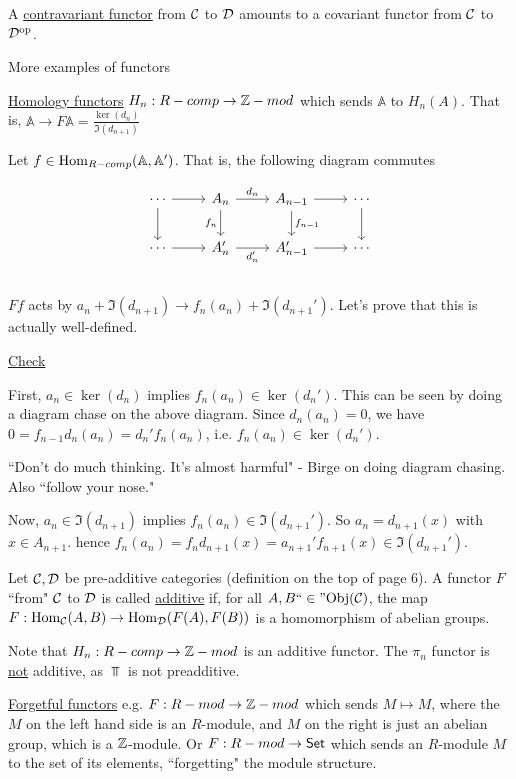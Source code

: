 \documentclass[x11names,reqno,14pt]{extarticle}
\newcommand{\A}{\mathbb{A}}
\newcommand{\fin}{``\in"}
\begin{document}

A \underline{contravariant functor} from $\mathcal{C}$ to $\mathcal{D}$ amounts to a covariant functor from $\mathcal{C}$ to $\mathcal{D}^{\mathrm{op}}$.

More examples of functors

\exm

\underline{Homology functors} $H_n:R-comp\to \mathbb{Z}-mod$ which sends $\A$ to $H_n(A)$. That is, $\A\to F\A = \frac{\ker(d_n)}{\Im(d_{n + 1})}$

Let $f \in \Hom_{R-comp}(\A,\A')$. That is, the following diagram commutes

\[
\begin{tikzcd}
\cdots \ar[r] \ar[d] & A_{n} \ar[d, "f_n"'] \ar[r, "d_{n}"] & A_{n - 1} \ar[r] \ar[d, "f_{n - 1}"] & \ar[d]\cdots  \\
\cdots \ar[r] & A'_n \ar[r, "d'_n"'] & A'_{n - 1} \ar[r] & \cdots \\
\end{tikzcd}
\]
$Ff$ acts by $a_n + \Im(d_{n + 1})\to f_n(a_n) + \Im(d_{n + 1}')$. Let's prove that this is actually well-defined. 

\underline{Check}

First, $a_n \in \ker(d_n)$ implies $f_n(a_n) \in \ker(d_n')$. This can be seen by doing a diagram chase on the above diagram. Since $d_n(a_n) = 0$, we have $0 = f_{n - 1}d_n(a_n) = d_n'f_n(a_n)$, i.e. $f_n(a_n)\in\ker(d_n')$. 


``Don't do much thinking. It's almost harmful" - Birge on doing diagram chasing. Also ``follow your nose."

Now, $a_n\in\Im(d_{n + 1})$ implies $f_n(a_n)\in\Im(d_{n + 1}')$. So $a_n = d_{n + 1}(x)$ with $x \in A_{n + 1}$. hence $f_n(a_n) = f_nd_{n + 1}(x) = a_{n + 1}'f_{n + 1}(x) \in \Im(d_{n + 1}')$. 

\exm

Let $\mathcal{C}, \mathcal{D}$ be pre-additive categories (definition on the top of page 6). A functor $F$ ``from" $\mathcal{C}$ to $\mathcal{D}$ is called \underline{additive} if, for all $A, B \fin \Obj(\mc{C})$, the map $F:{\mathrm{Hom}}_{\mathcal{C}}(A, B) \to {\mathrm{Hom}}_{\mathcal{D}}(F(A), F(B))$ is a homomorphism of abelian groups. 

\rem Note that $H_n:R-comp\to\mathbb{Z}-mod$ is an additive functor. The $\pi_n$ functor is \underline{not} additive, as $\Top$ is not preadditive. 

\exm

\underline{Forgetful functors} e.g. $F:R-mod\to\mathbb{Z}-mod$ which sends $M\mapsto M$, where the $M$ on the left hand side is an $R$-module, and $M$ on the right is just an abelian group, which is a $\mathbb{Z}$-module. Or $F:R-mod\to{{\text{\sffamily {Set}}}}$ which sends an $R$-module $M$ to the set of its elements, ``forgetting" the module structure. 
\end{document}
